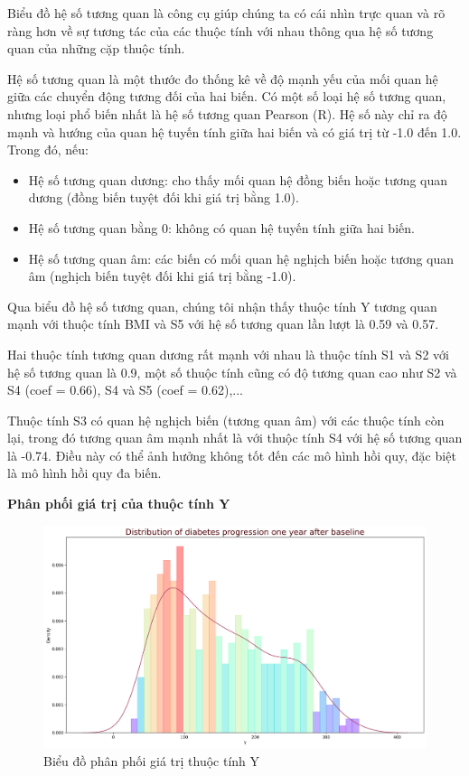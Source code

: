 \documentclass[runningheads]{llncs}
\begin{document}
Biểu đồ hệ số tương quan là công cụ giúp chúng ta có cái nhìn trực quan và rõ ràng hơn về sự tương tác của các thuộc tính với nhau thông qua hệ số tương quan của những cặp thuộc tính. 

Hệ số tương quan là một thước đo thống kê về độ mạnh yếu của mối quan hệ giữa các chuyển động tương đối của hai biến. Có một số loại hệ số tương quan, nhưng loại phổ biến nhất là hệ số tương quan Pearson (R). Hệ số này chỉ ra độ mạnh và hướng của quan hệ tuyến tính giữa hai biến và có giá trị từ -1.0 đến 1.0. Trong đó, nếu:
\begin{itemize}
\item Hệ số tương quan dương: cho thấy mối quan hệ đồng biến hoặc tương quan dương (đồng biến tuyệt đối khi giá trị bằng 1.0).
\item Hệ số tương quan bằng 0: không có quan hệ tuyến tính giữa hai biến.
\item Hệ số tương quan âm: các biến có mối quan hệ nghịch biến hoặc tương quan âm (nghịch biến tuyệt đối khi giá trị bằng -1.0).
\end{itemize}

Qua biểu đồ hệ số tương quan, chúng tôi nhận thấy thuộc tính Y tương quan mạnh với thuộc tính BMI và S5 với hệ số tương quan lần lượt là 0.59 và 0.57. 

Hai thuộc tính tương quan dương rất mạnh với nhau là thuộc tính S1 và S2 với hệ số tương quan là 0.9, một số thuộc tính cũng có độ tương quan cao như S2 và S4 (coef = 0.66), S4 và S5 (coef = 0.62),...

Thuộc tính S3 có quan hệ nghịch biến (tương quan âm) với các thuộc tính còn lại, trong đó tương quan âm mạnh nhất là với thuộc tính S4 với hệ số tương quan là -0.74.
Điều này có thể ảnh hưởng không tốt đến các mô hình hồi quy, đặc biệt là mô hình hồi quy đa biến.

\vspace{0.5cm}
\textbf{Phân phối giá trị của thuộc tính Y}
\begin{figure}[H]
\centering
\includegraphics[width=\textwidth]{Dist_Y}
\caption{Biểu đồ phân phối giá trị thuộc tính Y} \label{fig2}
\end{figure}
\end{document}

